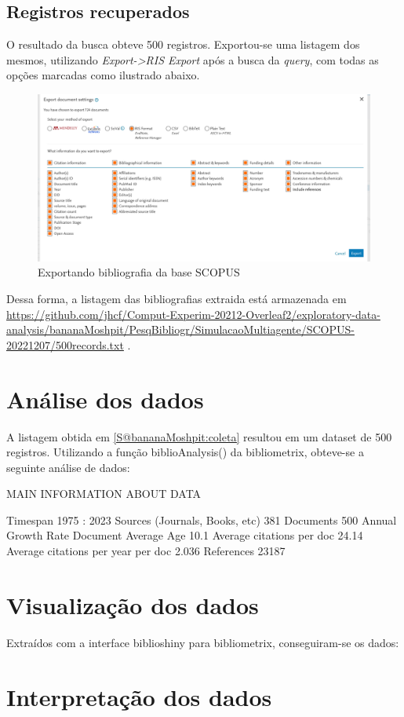 \subsection{Registros recuperados}

O resultado da busca obteve 500 registros. Exportou-se uma listagem dos mesmos, utilizando \textit{Export->RIS Export} após a busca da \textit{query}, com todas as opções marcadas como ilustrado abaixo.

\begin{figure}
    \centering
    \includegraphics[width=1.2\textwidth]{exploratory-data-analysis/bananaMoshpit/PesqBibliogr/SimulacaoMultiagente/SCOPUS-20221207/export-settings.png}
    \caption{Exportando bibliografia da base SCOPUS}
    \label{STL@bananaMoshpit-SCOPUS-extract}
\end{figure}

Dessa forma, a listagem das bibliografias extraida está armazenada em  \url{https://github.com/jhcf/Comput-Experim-20212-Overleaf2/exploratory-data-analysis/bananaMoshpit/PesqBibliogr/SimulacaoMultiagente/SCOPUS-20221207/500records.txt} .

\section{Análise dos dados\label{S@bananaMoshpit:analise}}
A listagem obtida em \ref{S@bananaMoshpit:coleta} resultou em um dataset de 500 registros. Utilizando a função biblioAnalysis() da bibliometrix, obteve-se a seguinte análise de dados:

MAIN INFORMATION ABOUT DATA

 Timespan                              1975 : 2023 
 Sources (Journals, Books, etc)        381 
 Documents                             500 
 Annual Growth Rate %
 Document Average Age                  10.1 
 Average citations per doc             24.14 
 Average citations per year per doc    2.036 
 References                            23187 


 \section{Visualização dos dados\label{S@bananaMoshpit:visualizacao}}
 Extraídos com a interface biblioshiny para bibliometrix, conseguiram-se os dados:



 
 \section{ Interpretação dos dados\label{S@bananaMoshpit:interpretacao}}
